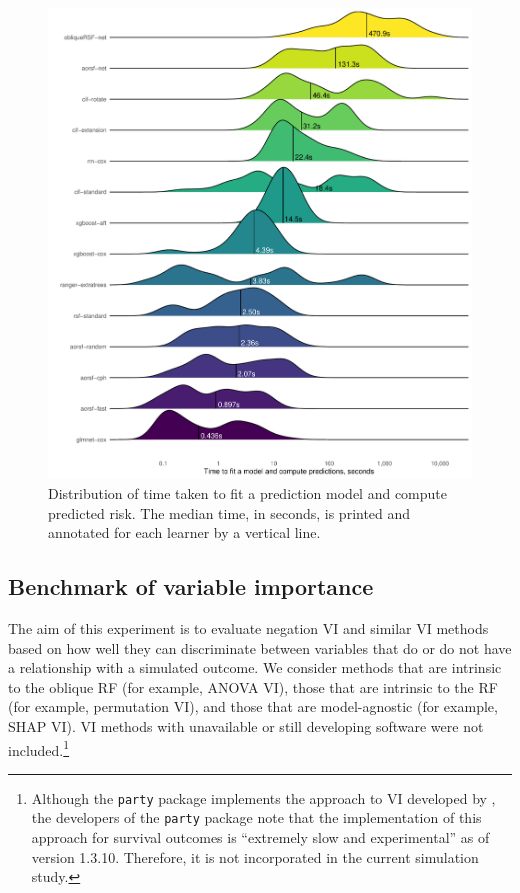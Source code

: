 \documentclass[twoside,11pt]{article}\usepackage[]{graphicx}\usepackage[]{xcolor}
\makeatletter
\def\maxwidth{ %
  \ifdim\Gin@nat@width>\linewidth
    \linewidth
  \else
    \Gin@nat@width
  \fi
}
\newenvironment{knitrout}{}{} %
\newcommand{\eg}{for example}
\makeatother
\begin{document}
\begin{knitrout}
\color{fgcolor}\begin{figure}
\includegraphics[width=\maxwidth]{figure/bm_pred_time-1} \caption[Distribution of time taken to fit a prediction model and compute predicted risk]{Distribution of time taken to fit a prediction model and compute predicted risk. The median time, in seconds, is printed and annotated for each learner by a vertical line.}\label{fig:bm_pred_time}
\end{figure}

\end{knitrout}


\subsection{Benchmark of variable importance} \label{sec:bm_vi}

The aim of this experiment is to evaluate negation VI and similar VI methods based on how well they can discriminate between variables that do or do not have a relationship with a simulated outcome. We consider methods that are intrinsic to the oblique RF (\eg, ANOVA VI), those that are intrinsic to the RF (\eg, permutation VI), and those that are model-agnostic (\eg, SHAP VI). VI methods with unavailable or still developing software were not included.\footnote{Although the \texttt{party} package implements the approach to VI developed by \citet{strobl2007bias}, the developers of the \texttt{party} package note that the implementation of this approach for survival outcomes is ``extremely slow and experimental'' as of version 1.3.10. Therefore, it is not incorporated in the current simulation study.}
\end{document}
